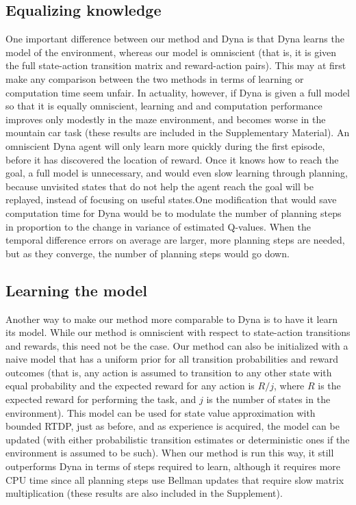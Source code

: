 \documentclass[letterpaper]{article}
\begin{document}
\subsection{Equalizing knowledge}

One important difference between our method and Dyna is that Dyna learns the model of the environment, whereas our model is omniscient (that is, it is given the full state-action transition matrix and reward-action pairs). This may at first make any comparison between the two methods in terms of learning or computation time seem unfair. In actuality, however, if Dyna is given a full model so that it is equally omniscient, learning and and computation performance improves only modestly in the maze environment, and becomes worse in the mountain car task (these results are included in the Supplementary Material). An omniscient Dyna agent will only learn more quickly during the first episode, before it has discovered the location of reward. Once it knows how to reach the goal, a full model is unnecessary, and would even slow learning through planning, because unvisited states that do not help the agent reach the goal will be replayed, instead of focusing on useful states.One modification that would save computation time for Dyna would be to modulate the number of planning steps in proportion to the change in variance of estimated Q-values. When the temporal difference errors on average are larger, more planning steps are needed, but as they converge, the number of planning steps would go down.

\subsection{Learning the model}

Another way to make our method more comparable to Dyna is to have it learn its model. While our method is omniscient with respect to state-action transitions and rewards, this need not be the case. Our method can also be initialized with a naive model that has a uniform prior for all transition probabilities and reward outcomes (that is, any action is assumed to transition to any other state with equal probability and the expected reward for any action is $R/j$, where $R$ is the expected reward for performing the task, and $j$ is the number of states in the environment). This model can be used for state value approximation with bounded RTDP, just as before, and as experience is acquired, the model can be updated (with either probabilistic transition estimates or deterministic ones if the environment is assumed to be such). When our method is run this way, it still outperforms Dyna in terms of steps required to learn, although it requires more CPU time since all planning steps use Bellman updates that require slow matrix multiplication (these results are also included in the Supplement).
\end{document}
